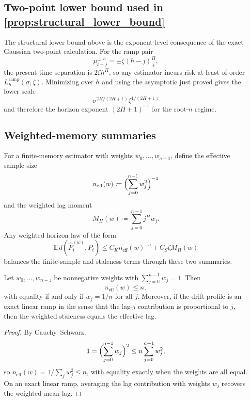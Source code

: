 \subsection{Two-point lower bound used in \cref{prop:structural_lower_bound}}

The structural lower bound above is the exponent-level consequence of the exact
Gaussian two-point calculation. For the ramp pair
\[
  \mu_{t-j}^{\pm,h}=\pm\zeta(h-j)_+^H,
\]
the present-time separation is $2\zeta h^H$, so any estimator incurs risk at
least of order $L_h^{\mathrm{ramp}}(\sigma,\zeta)$. Minimizing over $h$ and using
the asymptotic just proved gives the lower scale
\[
  \sigma^{2H/(2H+1)}\zeta^{1/(2H+1)}
\]
and therefore the horizon exponent $(2H+1)^{-1}$ for the root-$n$ regime.

\subsection{Weighted-memory summaries}

For a finite-memory estimator with weights $w_0,\dots,w_{n-1}$, define the
effective sample size
\[
  n_{\mathrm{eff}}(w) \coloneqq \Bigl(\sum_{j=0}^{n-1} w_j^2\Bigr)^{-1}
\]
and the weighted lag moment
\[
  M_H(w) \coloneqq \sum_{j=0}^{n-1} j^H w_j.
\]
Any weighted horizon law of the form
\[
  \mathbb E\,d\!\left(\widehat P_t^{(w)},P_t\right)
  \le C_K n_{\mathrm{eff}}(w)^{-a} + C_S\zeta M_H(w)
\]
balances the finite-sample and staleness terms through these two summaries.

\begin{proposition}
\label{prop:uniform_maximizes_effective_sample_size}
Let $w_0,\dots,w_{n-1}$ be nonnegative weights with $\sum_{j=0}^{n-1} w_j=1$.
Then
\[
  n_{\mathrm{eff}}(w) \le n,
\]
with equality if and only if $w_j=1/n$ for all $j$. Moreover, if the drift
profile is an exact linear ramp in the sense that the lag-$j$ contribution is
proportional to $j$, then the weighted staleness equals the effective lag.
\end{proposition}

\begin{proof}
By Cauchy--Schwarz,
\[
  1=\Bigl(\sum_{j=0}^{n-1} w_j\Bigr)^2
  \le n\sum_{j=0}^{n-1} w_j^2,
\]
so $n_{\mathrm{eff}}(w)=1/\sum_j w_j^2\le n$, with equality exactly when the
weights are all equal. On an exact linear ramp, averaging the lag contribution
with weights $w_j$ recovers the weighted mean lag.
\end{proof}
